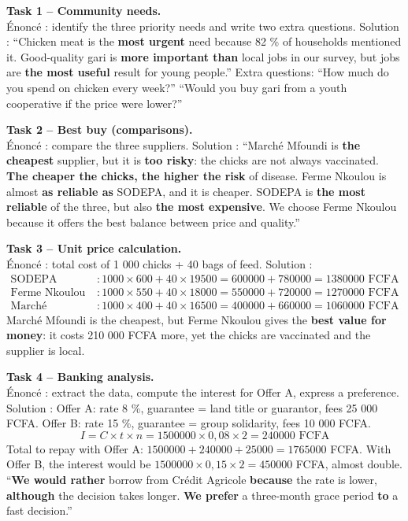 \documentclass[11pt]{article}
\begin{document}
\begin{exoresolu}
\textbf{Task 1 -- Community needs.}\\
Énoncé : identify the three priority needs and write two extra questions.
\tcblower
Solution : ``Chicken meat is the \textbf{most urgent} need because 82 \% of households mentioned it. Good-quality gari is \textbf{more important than} local jobs in our survey, but jobs are \textbf{the most useful} result for young people.'' Extra questions: ``How much do you spend on chicken every week?'' ``Would you buy gari from a youth cooperative if the price were lower?''

\textbf{Task 2 -- Best buy (comparisons).}\\
Énoncé : compare the three suppliers.
\tcblower
Solution : ``Marché Mfoundi is \textbf{the cheapest} supplier, but it is \textbf{too risky}: the chicks are not always vaccinated. \textbf{The cheaper the chicks, the higher the risk} of disease. Ferme Nkoulou is almost \textbf{as reliable as} SODEPA, and it is cheaper. SODEPA is \textbf{the most reliable} of the three, but also \textbf{the most expensive}. We choose Ferme Nkoulou because it offers the best balance between price and quality.''

\textbf{Task 3 -- Unit price calculation.}\\
Énoncé : total cost of 1 000 chicks + 40 bags of feed.
\tcblower
Solution :
\begin{align*}
\text{SODEPA} &: 1000 \times 600 + 40 \times 19500 = 600000 + 780000 = \num{1380000} \text{ FCFA}\\
\text{Ferme Nkoulou} &: 1000 \times 550 + 40 \times 18000 = 550000 + 720000 = \num{1270000} \text{ FCFA}\\
\text{Marché Mfoundi} &: 1000 \times 400 + 40 \times 16500 = 400000 + 660000 = \num{1060000} \text{ FCFA}
\end{align*}
Marché Mfoundi is the cheapest, but Ferme Nkoulou gives the \textbf{best value for money}: it costs 210 000 FCFA more, yet the chicks are vaccinated and the supplier is local.

\textbf{Task 4 -- Banking analysis.}\\
Énoncé : extract the data, compute the interest for Offer A, express a preference.
\tcblower
Solution : Offer A: rate 8 \%, guarantee = land title or guarantor, fees 25 000 FCFA. Offer B: rate 15 \%, guarantee = group solidarity, fees 10 000 FCFA.
\[ I = C \times t \times n = 1500000 \times 0,08 \times 2 = \num{240000} \text{ FCFA} \]
Total to repay with Offer A: $1500000 + 240000 + 25000 = \num{1765000}$ FCFA. With Offer B, the interest would be $1500000 \times 0,15 \times 2 = \num{450000}$ FCFA, almost double. ``\textbf{We would rather} borrow from Crédit Agricole \textbf{because} the rate is lower, \textbf{although} the decision takes longer. \textbf{We prefer} a three-month grace period \textbf{to} a fast decision.''


\end{exoresolu}
\end{document}

